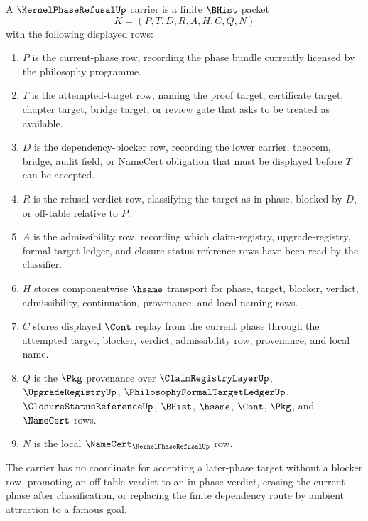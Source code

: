 \begin{definition}
\label{def:kernel-phase-refusal-carrier}
A $\KernelPhaseRefusalUp$ carrier is a finite $\BHist$ packet
$$
K=(P,T,D,R,A,H,C,Q,N)
$$
with the following displayed rows:
\begin{enumerate}
\item $P$ is the current-phase row, recording the phase bundle currently licensed by the philosophy programme.
\item $T$ is the attempted-target row, naming the proof target, certificate target, chapter target, bridge target, or review gate that asks to be treated as available.
\item $D$ is the dependency-blocker row, recording the lower carrier, theorem, bridge, audit field, or NameCert obligation that must be displayed before $T$ can be accepted.
\item $R$ is the refusal-verdict row, classifying the target as in phase, blocked by $D$, or off-table relative to $P$.
\item $A$ is the admissibility row, recording which claim-registry, upgrade-registry, formal-target-ledger, and closure-status-reference rows have been read by the classifier.
\item $H$ stores componentwise $\hsame$ transport for phase, target, blocker, verdict, admissibility, continuation, provenance, and local naming rows.
\item $C$ stores displayed $\Cont$ replay from the current phase through the attempted target, blocker, verdict, admissibility row, provenance, and local name.
\item $Q$ is the $\Pkg$ provenance over $\ClaimRegistryLayerUp$, $\UpgradeRegistryUp$, $\PhilosophyFormalTargetLedgerUp$, $\ClosureStatusReferenceUp$, $\BHist$, $\hsame$, $\Cont$, $\Pkg$, and $\NameCert$ rows.
\item $N$ is the local $\NameCert_{\KernelPhaseRefusalUp}$ row.
\end{enumerate}
The carrier has no coordinate for accepting a later-phase target without a blocker row, promoting an off-table verdict to an in-phase verdict, erasing the current phase after classification, or replacing the finite dependency route by ambient attraction to a famous goal.
\end{definition}

